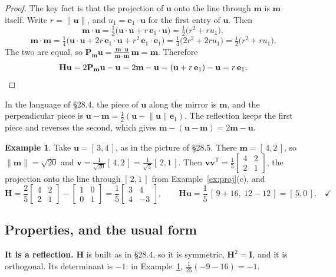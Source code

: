 \documentclass[11pt]{article}
\theoremstyle{plain}
\theoremstyle{definition}
\newtheorem{ex}{Example}[section]
\theoremstyle{remark}
\newcommand{\vc}[1]{\mathbf{#1}}
\newcommand{\mt}[1]{\mathbf{#1}}
\newcommand{\norm}[1]{\lVert #1\rVert}
\newcommand{\T}{^{\mathsf{T}}}
\begin{document}
\begin{proof}
The key fact is that the projection of $\vc{u}$ onto the line through $\vc{m}$
is $\vc{m}$ itself. Write $r=\norm{\vc{u}}$, and $u_1=\vc{e}_1\cdot\vc{u}$ for the
first entry of $\vc{u}$. Then
\[
  \vc{m}\cdot\vc{u}
  =\tfrac12\bigl(\vc{u}\cdot\vc{u}+r\,\vc{e}_1\cdot\vc{u}\bigr)
  =\tfrac12\bigl(r^{2}+ru_1\bigr),
\]
\[
  \vc{m}\cdot\vc{m}
  =\tfrac14\bigl(\vc{u}\cdot\vc{u}+2r\,\vc{e}_1\cdot\vc{u}
     +r^{2}\,\vc{e}_1\cdot\vc{e}_1\bigr)
  =\tfrac14\bigl(2r^{2}+2ru_1\bigr)
  =\tfrac12\bigl(r^{2}+ru_1\bigr).
\]
The two are equal, so
$\mt{P}_{\vc{m}}\vc{u}=\frac{\vc{m}\cdot\vc{u}}{\vc{m}\cdot\vc{m}}\,\vc{m}=\vc{m}$.
Therefore
\[
  \mt{H}\vc{u}=2\mt{P}_{\vc{m}}\vc{u}-\vc{u}
  =2\vc{m}-\vc{u}
  =(\vc{u}+r\,\vc{e}_1)-\vc{u}
  =r\,\vc{e}_1 .
  \qedhere
\]
\end{proof}

\noindent In the language of \S28.4, the piece of $\vc{u}$ along the mirror is
$\vc{m}$, and the perpendicular piece is
$\vc{u}-\vc{m}=\frac12(\vc{u}-\norm{\vc{u}}\vc{e}_1)$. The reflection keeps the
first piece and reverses the second, which gives
$\vc{m}-(\vc{u}-\vc{m})=2\vc{m}-\vc{u}$.

\begin{ex}
\label{ex:householder}
Take $\vc{u}=[\,3,4\,]$, as in the picture of \S28.5. There
$\vc{m}=[\,4,2\,]$, so $\norm{\vc{m}}=\sqrt{20}$ and
$\vc{v}=\frac{1}{\sqrt{20}}[\,4,2\,]=\frac{1}{\sqrt5}[\,2,1\,]$. Then
$\vc{v}\vc{v}\T=\frac15\begin{bmatrix}4&2\\2&1\end{bmatrix}$, the projection
onto the line through $[\,2,1\,]$ from Example~\ref{ex:proj}(c), and
\[
  \mt{H}=\frac25\begin{bmatrix}4&2\\2&1\end{bmatrix}
        -\begin{bmatrix}1&0\\0&1\end{bmatrix}
  =\frac15\begin{bmatrix}3&4\\4&-3\end{bmatrix},
  \qquad
  \mt{H}\vc{u}=\frac15\,[\,9+16,\ 12-12\,]=[\,5,0\,] . \quad\checkmark
\]
\end{ex}

\subsection{Properties, and the usual form}
\textbf{It is a reflection.} $\mt{H}$ is built as in \S28.4, so it is
symmetric, $\mt{H}^{2}=\mt{I}$, and it is orthogonal. Its determinant is $-1$:
in Example~\ref{ex:householder}, $\frac{1}{25}(-9-16)=-1$.
\end{document}
